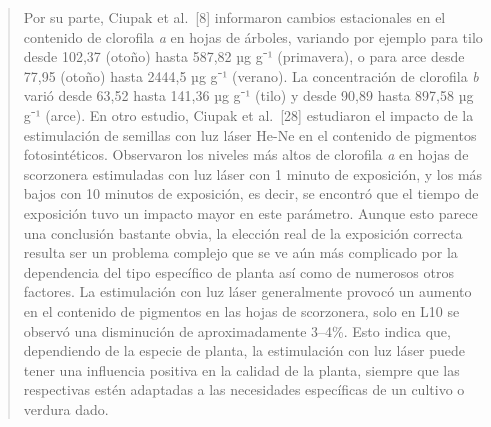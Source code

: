\documentclass[
]{article}
\begin{document}
\begin{quote}
Por su parte, Ciupak et al.~{[}8{]} informaron cambios estacionales en
el contenido de clorofila \emph{a} en hojas de árboles, variando por
ejemplo para tilo desde 102,37 (otoño) hasta 587,82 µg g⁻¹ (primavera),
o para arce desde 77,95 (otoño) hasta 2444,5 µg g⁻¹ (verano). La
concentración de clorofila \emph{b} varió desde 63,52 hasta 141,36 µg
g⁻¹ (tilo) y desde 90,89 hasta 897,58 µg g⁻¹ (arce). En otro estudio,
Ciupak et al.~{[}28{]} estudiaron el impacto de la estimulación de
semillas con luz láser He-Ne en el contenido de pigmentos
fotosintéticos. Observaron los niveles más altos de clorofila \emph{a}
en hojas de scorzonera estimuladas con luz láser con 1 minuto de
exposición, y los más bajos con 10 minutos de exposición, es decir, se
encontró que el tiempo de exposición tuvo un impacto mayor en este
parámetro. Aunque esto parece una conclusión bastante obvia, la elección
real de la exposición correcta resulta ser un problema complejo que se
ve aún más complicado por la dependencia del tipo específico de planta
así como de numerosos otros factores. La estimulación con luz láser
generalmente provocó un aumento en el contenido de pigmentos en las
hojas de scorzonera, solo en L10 se observó una disminución de
aproximadamente 3--4\%. Esto indica que, dependiendo de la especie de
planta, la estimulación con luz láser puede tener una influencia
positiva en la calidad de la planta, siempre que las respectivas estén
adaptadas a las necesidades específicas de un cultivo o verdura dado.
\end{quote}
\end{document}

